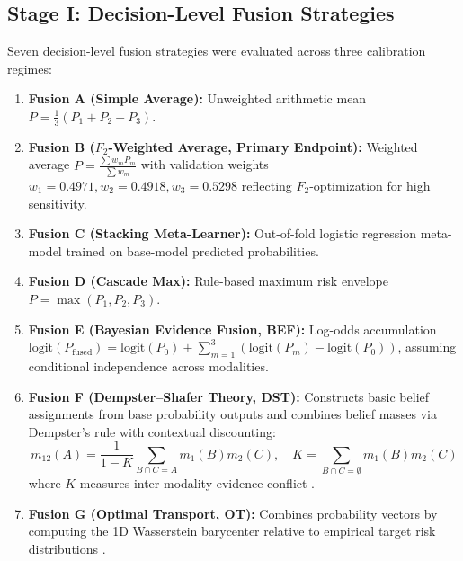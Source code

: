 \subsection{Stage I: Decision-Level Fusion Strategies}
Seven decision-level fusion strategies were evaluated across three calibration regimes:
\begin{enumerate}
    \item \textbf{Fusion A (Simple Average):} Unweighted arithmetic mean $P = \frac{1}{3}(P_1 + P_2 + P_3)$.
    \item \textbf{Fusion B ($F_2$-Weighted Average, Primary Endpoint):} Weighted average $P = \frac{\sum w_m P_m}{\sum w_m}$ with validation weights $w_1 = 0.4971, w_2 = 0.4918, w_3 = 0.5298$ reflecting $F_2$-optimization for high sensitivity.
    \item \textbf{Fusion C (Stacking Meta-Learner):} Out-of-fold logistic regression meta-model trained on base-model predicted probabilities.
    \item \textbf{Fusion D (Cascade Max):} Rule-based maximum risk envelope $P = \max(P_1, P_2, P_3)$.
    \item \textbf{Fusion E (Bayesian Evidence Fusion, BEF):} Log-odds accumulation $\text{logit}(P_{\text{fused}}) = \text{logit}(P_0) + \sum_{m=1}^3 (\text{logit}(P_m) - \text{logit}(P_0))$, assuming conditional independence across modalities.
    \item \textbf{Fusion F (Dempster--Shafer Theory, DST):} Constructs basic belief assignments from base probability outputs and combines belief masses via Dempster's rule with contextual discounting:
    \begin{equation}
        m_{12}(A) = \frac{1}{1 - K} \sum_{B \cap C = A} m_1(B) m_2(C), \quad K = \sum_{B \cap C = \emptyset} m_1(B) m_2(C)
    \end{equation}
    where $K$ measures inter-modality evidence conflict \cite{liu2017weighted, fontani2013dempster, huang2024deep}.
    \item \textbf{Fusion G (Optimal Transport, OT):} Combines probability vectors by computing the 1D Wasserstein barycenter relative to empirical target risk distributions \cite{courty2016optimal, kolouri2017optimal}.
\end{enumerate}

